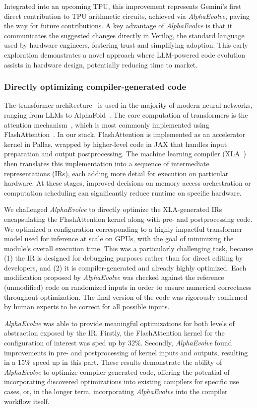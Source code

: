 \documentclass[logo,copyright,12pt]{googledeepmind}
\theoremstyle{definition}
\theoremstyle{remark}
\theoremstyle{plain}
\newcommand{\method}{\emph{AlphaEvolve}\xspace}
\begin{document}
Integrated into an upcoming TPU, this improvement represents Gemini’s first direct contribution to TPU arithmetic circuits, achieved via \method, paving the way for future contributions. A key advantage of \method is that it communicates the suggested changes directly in Verilog, the standard language used by hardware engineers, fostering trust and simplifying adoption. This early exploration demonstrates a novel approach where LLM-powered code evolution assists in hardware design, potentially reducing time to market.


\subsubsection{Directly optimizing compiler-generated code}

The transformer architecture~\cite{vaswani2017attention} is used in the majority of modern neural networks, ranging from LLMs to AlphaFold~\cite{alphafold3}. 
The core computation of transformers is the attention mechanism~\cite{bahdanau2014neural}, which is most commonly implemented using FlashAttention~\cite{dao2022flashattention}.
In our stack, FlashAttention is implemented as an accelerator kernel in Pallas, wrapped by higher-level code in JAX that handles input preparation and output postprocessing.
The machine learning compiler (XLA~\cite{xla}) then translates this implementation into a sequence of intermediate representations (IRs), each adding more detail for execution on particular hardware. At these stages, improved decisions on memory access orchestration or computation scheduling can significantly reduce runtime on specific hardware.

We challenged \method to directly optimize the XLA-generated IRs encapsulating the FlashAttention kernel along with pre- and postprocessing code. We optimized a configuration corresponding to a highly impactful transformer model used for inference at scale on GPUs, with the goal of minimizing the module's overall execution time. This was a particularly challenging task, because (1) the IR is designed for debugging purposes rather than for direct editing by developers, and (2) it is compiler-generated and already highly optimized. Each modification proposed by \method was checked against the reference (unmodified) code on randomized inputs in order to ensure numerical correctness throughout optimization. The final version of the code was rigorously confirmed by human experts to be correct for all possible inputs.

\method was able to provide meaningful optimizations for both levels of abstraction exposed by the IR. Firstly, the FlashAttention kernel for the configuration of interest was sped up by 32\%. Secondly, \method found improvements in pre- and postprocessing of kernel inputs and outputs, resulting in a 15\% speed up in this part. These results demonstrate the ability of \method to optimize compiler-generated code, offering the potential of incorporating discovered optimizations into existing compilers for specific use cases, or, in the longer term, incorporating \method into the compiler workflow itself.
\end{document}
